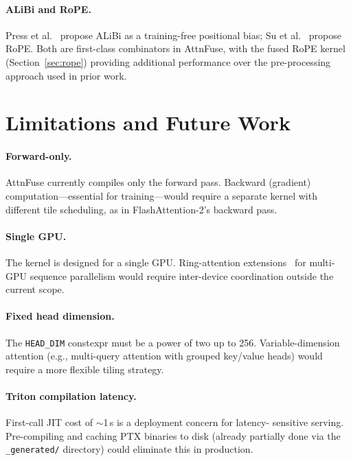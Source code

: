 \documentclass[10pt,twocolumn]{article}
\begin{document}
\paragraph{ALiBi and RoPE.}
Press et al.~\cite{press2021alibi} propose ALiBi as a training-free
positional bias; Su et al.~\cite{su2021roformer} propose RoPE.
Both are first-class combinators in AttnFuse, with the fused RoPE kernel
(Section~\ref{sec:rope}) providing additional performance over the
pre-processing approach used in prior work.

\section{Limitations and Future Work}

\paragraph{Forward-only.}
AttnFuse currently compiles only the forward pass.  Backward (gradient)
computation---essential for training---would require a separate kernel
with different tile scheduling, as in FlashAttention-2's backward pass.

\paragraph{Single GPU.}
The kernel is designed for a single GPU.  Ring-attention
extensions~\cite{liu2023ring} for multi-GPU sequence parallelism would
require inter-device coordination outside the current scope.

\paragraph{Fixed head dimension.}
The \texttt{HEAD\_DIM} constexpr must be a power of two up to 256.
Variable-dimension attention (e.g., multi-query attention with grouped
key/value heads) would require a more flexible tiling strategy.

\paragraph{Triton compilation latency.}
First-call JIT cost of $\sim$1\,s is a deployment concern for latency-
sensitive serving.  Pre-compiling and caching PTX binaries to disk
(already partially done via the \texttt{\_generated/} directory) could
eliminate this in production.
\end{document}

